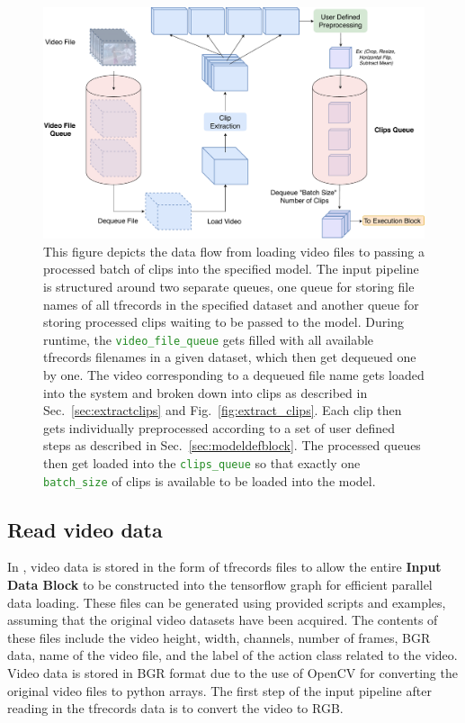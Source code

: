 \documentclass{llncs}
\begin{document}
\begin{figure}[t!]
\centering
\includegraphics[width=1.0\columnwidth]{images/ip_pipeline.pdf}
\caption{This figure depicts the data flow from loading video files to passing a processed batch of clips into the specified model.
The input pipeline is structured around two separate queues, one queue for storing file names of all tfrecords in the specified dataset and another queue for storing processed clips waiting to be passed to the model.
During runtime, the \texttt{\textcolor{ForestGreen}{video\_file\_queue}} gets filled with all available tfrecords filenames in a given dataset, which then get dequeued one by one.
The video corresponding to a dequeued file name gets loaded into the system and broken down into clips as described in Sec.~\ref{sec:extractclips} and Fig.~\ref{fig:extract_clips}.
Each clip then gets individually preprocessed according to a set of user defined steps as described in Sec.~\ref{sec:modeldefblock}.
The processed queues then get loaded into the \texttt{\textcolor{ForestGreen}{clips\_queue}} so that exactly one \texttt{\textcolor{ForestGreen}{batch\_size}} of clips is available to be loaded into the model.}
\label{fig:ip_block}
\end{figure}


\subsection{Read video data}
\label{sec:readdata}
In \acro, video data is stored in the form of tfrecords files to allow the entire \textbf{Input Data Block} to be constructed into the tensorflow graph for efficient parallel data loading.
These files can be generated using provided scripts and examples, assuming that the original video datasets have been acquired.
The contents of these files include the video height, width, channels, number of frames, BGR data, name of the video file, and the label of the action class related to the video.
Video data is stored in BGR format due to the use of OpenCV for converting the original video files to python arrays.
The first step of the input pipeline after reading in the tfrecords data is to convert the video to RGB.
\end{document}
